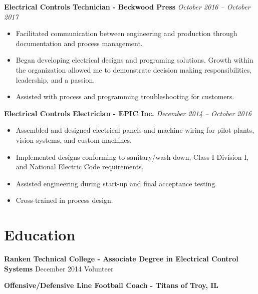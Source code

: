 \documentclass[letterpaper,10pt]{article} %
\newcommand{\job}[3]{
\textbf{#1 - #2} \hfill \textit{#3}
}
\newcommand{\education}[4]{
  \textbf{#1 - #2} \hfill #3
}
\begin{document}
\noindent\job{Electrical Controls Technician}{Beckwood Press}{October 2016 – October 2017}
\begin{itemize}[left=2em]
	\item Facilitated communication between engineering and production through documentation and process management.
	\item Began developing electrical designs and programing solutions. Growth within the organization allowed me to demonstrate
	decision making responsibilities, leadership, and a passion.
	\item Assisted with process and programming troubleshooting for customers.
\end{itemize}

\noindent\job{Electrical Controls Electrician}{EPIC Inc.}{December 2014 – October 2016}
\begin{itemize}[left=2em]
	\item Assembled and designed electrical panels and machine wiring for pilot plants, vision systems, and custom machines.
	\item Implemented designs conforming to sanitary/wash-down, Class I Division I, and National Electric Code requirements.
	\item Assisted engineering during start-up and final acceptance testing.
	\item Cross-trained in process design.
\end{itemize}

\section{Education}
\education{Ranken Technical College}{Associate Degree in Electrical Control Systems}{December 2014}

\section{Volunteer}
\job{Offensive/Defensive Line Football Coach}{Titans of Troy, IL}{}
\end{document}
